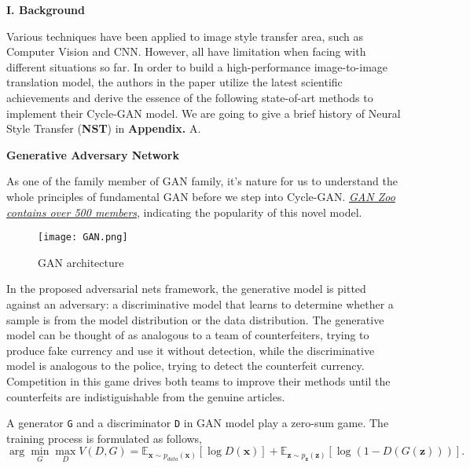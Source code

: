 \documentclass[a4paper]{article}
\begin{document}
\vspace{6mm}
\begin{center}
\LARGE\textbf{I. Background} \\
\end{center}
\vspace{2mm}

\large{Various techniques have been applied to image style transfer area, such as Computer Vision and CNN. However, all have limitation when facing with different situations so far. In order to build a high-performance image-to-image translation model, the authors in the paper utilize the latest scientific achievements and derive the essence of the following state-of-art methods to implement their \textsf{Cycle-GAN} model. We are going to give a brief history of Neural Style Transfer (\textbf{NST}) in \textbf{Appendix.} A.}

\begin{center}
\large\textbf{Generative Adversary Network} \\
\end{center}

\large
As one of the family member of \textsf{GAN} family, it's nature for us to understand the whole principles of fundamental \textsf{GAN} before we step into \textsf{Cycle-GAN}. \href{https://github.com/hindupuravinash/the-gan-zoo}{\emph{\textsf{GAN} Zoo contains over 500 members}}, indicating the popularity of this novel model. 

\vspace{3mm}
\begin{figure}[h]
\centering
\texttt{[image: GAN.png]}
\caption{\textsf{GAN} architecture}
\end{figure}
\vspace{3mm}

In the proposed adversarial nets framework, the generative model is pitted against an adversary: a discriminative model that learns to determine whether a sample is from the model distribution or the data distribution. The generative model can be thought of as analogous to a team of counterfeiters, trying to produce fake currency and use it without detection, while the discriminative model is analogous to the police, trying to detect the counterfeit currency. Competition in this game drives both teams to improve their methods until the counterfeits are indistiguishable from the genuine articles. 

A generator \texttt{G} and a discriminator \texttt{D} in \textsf{GAN} model play a zero-sum game. The training process is formulated as follows,
\begin{equation}
\arg \mathop{\min}_{G}\mathop{\max}_{D}V(D,G)=\mathbb{E}_{ \boldsymbol x\sim p_{data}(\boldsymbol x)} [\log D(\boldsymbol x)] + \mathbb{E}_{ \boldsymbol z\sim p_{ \boldsymbol z}(\boldsymbol z)} [\log {(1-D(G(\boldsymbol z)))}].
\end{equation}
\end{document}
